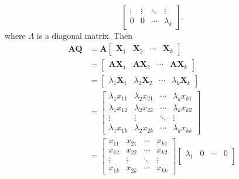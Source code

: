 \documentclass[oneside]{book}
\begin{document}
{{\[\begin{bmatrix}
                    \vdots      & \vdots      & \ddots & \vdots\\
                    0           & 0           & \cdots & \lambda_{k}
                \end{bmatrix}
                .
        \]
        where $\Lambda$ is a diagonal matrix. Then
        \begin{align}
            \mathbf{A}\mathbf{Q}&=
                \mathbf{A}
                \begin{bmatrix}
                    \mathbf{X}_{1} & \mathbf{X}_{2} & \cdots & \mathbf{X}_{k}
                \end{bmatrix}\\
                &=
                \begin{bmatrix}
                    \mathbf{A}\mathbf{X}_{1} & \mathbf{A}\mathbf{X}_{2} & \cdots & \mathbf{A}\mathbf{X}_{k}
                \end{bmatrix}\\
                &=
                \begin{bmatrix}
                    \lambda_{1}\mathbf{X}_{1} & \lambda_{2}\mathbf{X}_{2} & \cdots & \lambda_{k}\mathbf{X}_{k}
                \end{bmatrix}\\
                &=
                \begin{bmatrix}
                    \lambda_{1}x_{11} & \lambda_{2}x_{21} & \cdots & \lambda_{k}x_{k1}\\
                    \lambda_{1}x_{12} & \lambda_{2}x_{22} & \cdots & \lambda_{k}x_{k2}\\
                    \vdots            & \vdots            & \ddots & \vdots\\
                    \lambda_{1}x_{1k} & \lambda_{2}x_{2k} & \cdots & \lambda_{k}x_{kk}
                \end{bmatrix}\\
                &=
                \begin{bmatrix}
                    x_{11} & x_{21} & \cdots & x_{k1}\\
                    x_{12} & x_{22} & \cdots & x_{k2}\\
                    \vdots & \vdots & \ddots & \vdots\\
                    x_{1k} & x_{2k} & \cdots & x_{kk}
                \end{bmatrix}
                \begin{bmatrix}
                    \lambda_{1} & 0           & \cdots & 0\\

\end{bmatrix}
\end{align}}}
\end{document}
